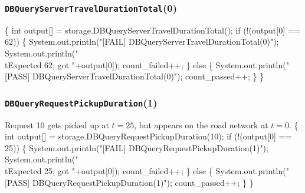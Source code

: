 \documentclass{article}
\def\nwendcode{\endtrivlist \endgroup}
\let\nwdocspar=\par
\begin{document}
\subsubsection{{\tt{}DBQueryServerTravelDurationTotal}(0)}
\nwenddocs{}\endmoddef{}
\{
  int output[] = storage.DBQueryServerTravelDurationTotal();
  if (!(output[0] == 62)) \{
    System.out.println("[FAIL] DBQueryServerTravelDurationTotal(0)");
    System.out.println("\\tExpected 62; got "+output[0]);
    count_failed++;
  \} else \{
    System.out.println("[PASS] DBQueryServerTravelDurationTotal(0)");
    count_passed++;
  \}
\}
\nwendcode{}\nwdocspar
\subsubsection{{\tt{}DBQueryRequestPickupDuration}(1)}
Request 10 gets picked up at $t=25$, but appears on the road network at $t=0$.
\nwenddocs{}\endmoddef{}
\{
  int output[] = storage.DBQueryRequestPickupDuration(10);
  if (!(output[0] == 25)) \{
    System.out.println("[FAIL] DBQueryRequestPickupDuration(1)");
    System.out.println("\\tExpected 25; got "+output[0]);
    count_failed++;
  \} else \{
    System.out.println("[PASS] DBQueryRequestPickupDuration(1)");
    count_passed++;
  \}
\}
\nwendcode{}\nwdocspar
\end{document}
